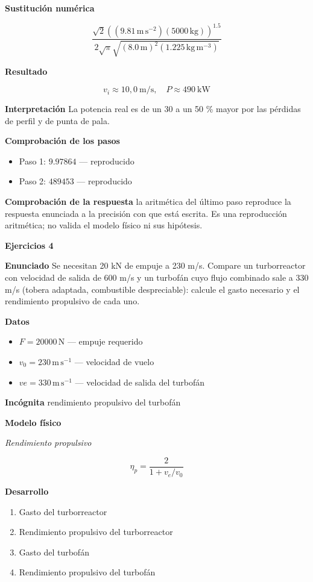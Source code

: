 \documentclass[10pt,openany]{book}
\begin{document}
\noindent\textbf{Sustitución numérica}

\[
\frac{\sqrt{2} \left(\left(9.81\,\mathrm{m}\,\mathrm{s}^{-2}\right) \left(5000\,\mathrm{kg}\right)\right)^{1.5}}{2 \sqrt{\pi} \sqrt{\left(8.0\,\mathrm{m}\right)^{2} \left(1.225\,\mathrm{kg}\,\mathrm{m}^{-3}\right)}}
\]

\noindent\textbf{Resultado}

\[
v_i \approx 10{,}0\ \mathrm{m/s},\quad P \approx 490\ \mathrm{kW}
\]

\noindent\textbf{Interpretación}
La potencia real es de un 30 a un 50 \% mayor por las pérdidas de perfil y de punta de pala.

\noindent\textbf{Comprobación de los pasos}
\begin{itemize}
\item Paso 1: $9.97864$ — reproducido
\item Paso 2: $489453$ — reproducido
\end{itemize}

\noindent\textbf{Comprobación de la respuesta} la aritmética del último paso reproduce la respuesta enunciada a la precisión con que está escrita. Es una reproducción aritmética; no valida el modelo físico ni sus hipótesis.

\noindent\textbf{Ejercicios 4}

\noindent\textbf{Enunciado}
Se necesitan 20 kN de empuje a 230 m/s. Compare un turborreactor con velocidad de salida de 600 m/s y un turbofán cuyo flujo combinado sale a 330 m/s (tobera adaptada, combustible despreciable): calcule el gasto necesario y el rendimiento propulsivo de cada uno.

\noindent\textbf{Datos}
\begin{itemize}
\item $F = 20000\,\mathrm{N}$ — empuje requerido
\item $v_{0} = 230\,\mathrm{m}\,\mathrm{s}^{-1}$ — velocidad de vuelo
\item $ve = 330\,\mathrm{m}\,\mathrm{s}^{-1}$ — velocidad de salida del turbofán
\end{itemize}

\noindent\textbf{Incógnita}
rendimiento propulsivo del turbofán

\noindent\textbf{Modelo físico}

\noindent\textit{Rendimiento propulsivo}

\[
\eta_p = \frac{2}{1 + v_e/v_0}
\]

\noindent\textbf{Desarrollo}
\begin{enumerate}
\item
Gasto del turborreactor
\item
Rendimiento propulsivo del turborreactor
\item
Gasto del turbofán
\item
Rendimiento propulsivo del turbofán
\end{enumerate}
\end{document}
